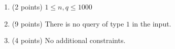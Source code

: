 \begin{enumerate}
    \tightlist
    \item (2 points) $1 \leq n,q \leq 1000$
    \item (9 points) There is no query of type $1$ in the input.
    \item (4 points)  No additional constraints.
\end{enumerate}
    